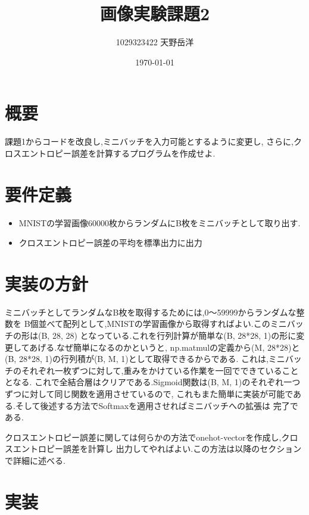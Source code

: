 \documentclass[a4paper,11pt]{jsarticle}
\begin{document}
\title{画像実験課題2}
\author{1029323422 天野岳洋}
\date{\today}
\maketitle
\clearpage

\section{概要}
課題1からコードを改良し,ミニバッチを入力可能とするように変更し,
さらに,クロスエントロピー誤差を計算するプログラムを作成せよ.

\section{要件定義}
\begin{itemize}
  \item MNISTの学習画像60000枚からランダムにB枚をミニバッチとして取り出す.
  \item クロスエントロピー誤差の平均を標準出力に出力
\end{itemize}

\section{実装の方針}
ミニバッチとしてランダムなB枚を取得するためには,0～59999からランダムな整数を
B個並べて配列として,MNISTの学習画像から取得すればよい.このミニバッチの形は(B, 28, 28)
となっている.これを行列計算が簡単な(B, 28*28, 1)の形に変更してあげる.なぜ簡単になるのかというと,
np.matmulの定義から(M, 28*28)と(B, 28*28, 1)の行列積が(B, M, 1)として取得できるからである.
これは,ミニバッチのそれぞれ一枚ずつに対して,重みをかけている作業を一回でできていることとなる.
これで全結合層はクリアである.Sigmoid関数は(B, M, 1)のそれぞれ一つずつに対して同じ関数を適用させているので,
これもまた簡単に実装が可能である.そして後述する方法でSoftmaxを適用させればミニバッチへの拡張は
完了である.
\par 
クロスエントロピー誤差に関しては何らかの方法でonehot-vectorを作成し,クロスエントロピー誤差を計算し
出力してやればよい.この方法は以降のセクションで詳細に述べる.

\section{実装}
\end{document}
